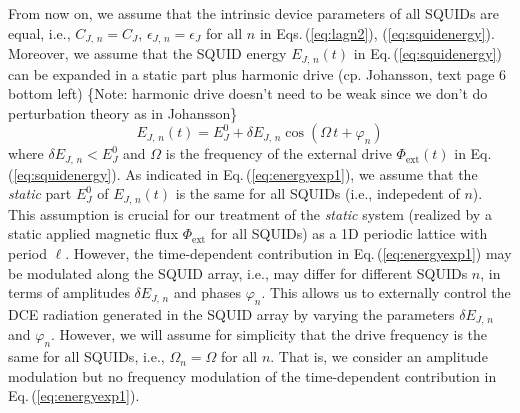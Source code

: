 From now on, we assume that the intrinsic device parameters of all SQUIDs are equal, i.e., 
$C_{J,\,n} = C_J$, $\epsilon_{J,\,n} = \epsilon_J$ for all $n$ in Eqs.\,(\ref{eq:lagn2}), (\ref{eq:squidenergy}).  
Moreover, we assume that the SQUID energy $E_{J,\,n}(t)$ in Eq.\,(\ref{eq:squidenergy}) 
can be expanded in a static part plus harmonic drive 
(cp. Johansson, text page 6 bottom left)
\color{red}
\{Note: harmonic drive doesn't need to be weak since we don't do perturbation theory as in Johansson\}
\color{black}
%
\begin{equation} \label{eq:energyexp1}
E_{J,\,n}(t) = E_J^0 + \delta E_{J,\,n} \cos(\Omega \, t + \varphi_n) 
\end{equation}
%
where $\delta E_{J,\,n} < E_J^0$ and $\Omega$ is the frequency of the external drive 
$\Phi_{\text{ext}}(t)$ in Eq.\,(\ref{eq:squidenergy}).
As indicated in Eq.\,(\ref{eq:energyexp1}), we assume that the {\em static} part 
$E_J^0$ of $E_{J,\,n}(t)$ is the same for all SQUIDs (i.e., indepedent of $n$). 
This assumption is crucial for our 
treatment of the {\em static} system (realized by a static applied magnetic flux $\Phi_{\text{ext}}$
for all SQUIDs) as a 1D periodic lattice with period $\ell$. However, the 
time-dependent contribution in Eq.\,(\ref{eq:energyexp1})
may be modulated along the SQUID array, i.e., may differ for different SQUIDs $n$,
in terms of amplitudes $\delta E_{J,\,n}$ and phases $\varphi_n$.
This allows us to externally control the DCE radiation generated in the SQUID array
by varying the parameters $\delta E_{J,\,n}$ and $\varphi_n$.
However, we will assume for simplicity that the drive frequency 
is the same for all SQUIDs, i.e., $\Omega_n = \Omega$ for all $n$.
That is, we consider an amplitude modulation but no frequency modulation of the 
time-dependent contribution in Eq.\,(\ref{eq:energyexp1}). 
%
%
%
%
%

